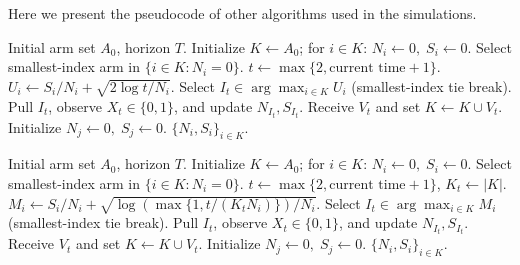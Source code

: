 \documentclass[
  12pt]{article}
\begin{document}
Here we present the pseudocode of other algorithms used in the simulations.
\begin{algorithm}[htbp]
\caption{\textbf{Growing UCB1 for Arriving Arms}}
\begin{algorithmic}[1]
\Require Initial arm set $A_0$, horizon $T$.
\State Initialize $K\gets A_0$; for $i\in K$: $N_i\gets0,\;S_i\gets0$.
        \State Select smallest-index arm in $\{i\in K:N_i=0\}$.
    \Else
        \State $t\gets \max\{2,\text{current time}+1\}$.
            \State $U_i\gets S_i/N_i+\sqrt{2\log t/N_i}$.
        \EndFor
        \State Select $I_t\in\arg\max_{i\in K}U_i$ (smallest-index tie break).
    \EndIf
    \State Pull $I_t$, observe $X_t\in\{0,1\}$, and update $N_{I_t},S_{I_t}$.
    \State Receive $V_t$ and set $K\gets K\cup V_t$.
        \State Initialize $N_j\gets0,\;S_j\gets0$.
    \EndFor
\EndWhile
\State \Return $\{N_i,S_i\}_{i\in K}$.
\end{algorithmic}
\end{algorithm}

\begin{algorithm}[htbp]
\caption{\textbf{Growing MOSS for Arriving Arms}}
\begin{algorithmic}[1]
\Require Initial arm set $A_0$, horizon $T$.
\State Initialize $K\gets A_0$; for $i\in K$: $N_i\gets0,\;S_i\gets0$.
        \State Select smallest-index arm in $\{i\in K:N_i=0\}$.
    \Else
        \State $t\gets \max\{2,\text{current time}+1\}$, $K_t\gets |K|$.
            \State $M_i\gets S_i/N_i+\sqrt{\log(\max\{1,t/(K_tN_i)\})/N_i}$.
        \EndFor
        \State Select $I_t\in\arg\max_{i\in K}M_i$ (smallest-index tie break).
    \EndIf
    \State Pull $I_t$, observe $X_t\in\{0,1\}$, and update $N_{I_t},S_{I_t}$.
    \State Receive $V_t$ and set $K\gets K\cup V_t$.
        \State Initialize $N_j\gets0,\;S_j\gets0$.
    \EndFor
\EndWhile
\State \Return $\{N_i,S_i\}_{i\in K}$.
\end{algorithmic}
\end{algorithm}
\end{document}
